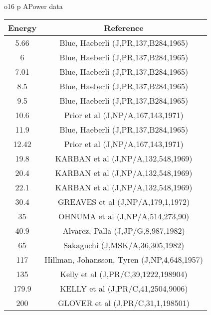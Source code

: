\caption{o16 p APower data}\begin{tabular}{|c||c|} 
 \hline 
\bf{Energy} & \bf{Reference} \\
 \hline
 \hline 
5.66 & Blue, Haeberli (J,PR,137,B284,1965)\\
6 & Blue, Haeberli (J,PR,137,B284,1965)\\
7.01 & Blue, Haeberli (J,PR,137,B284,1965)\\
8.5 & Blue, Haeberli (J,PR,137,B284,1965)\\
9.5 & Blue, Haeberli (J,PR,137,B284,1965)\\
10.6 & Prior et al (J,NP/A,167,143,1971)\\
11.9 & Blue, Haeberli (J,PR,137,B284,1965)\\
12.42 & Prior et al (J,NP/A,167,143,1971)\\
19.8 & KARBAN et al (J,NP/A,132,548,1969)\\
20.4 & KARBAN et al (J,NP/A,132,548,1969)\\
22.1 & KARBAN et al (J,NP/A,132,548,1969)\\
30.4 & GREAVES et al (J,NP/A,179,1,1972)\\
35 & OHNUMA et al (J,NP/A,514,273,90)\\
40.9 & Alvarez, Palla (J,JP/G,8,987,1982)\\
65 & Sakaguchi (J,MSK/A,36,305,1982)\\
117 & Hillman, Johansson, Tyren (J,NP,4,648,1957)\\
135 & Kelly et al (J,PR/C,39,1222,198904)\\
179.9 & KELLY et al (J,PR/C,41,2504,9006)\\
200 & GLOVER et al (J,PR/C,31,1,198501)\\
\end{tabular}